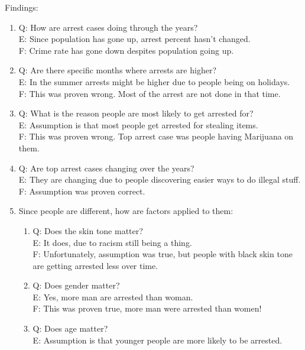 \documentclass{article}\usepackage[]{graphicx}\usepackage[]{color}
\begin{document}
      Findings:
      \begin{enumerate}
        \item	
          Q: How are arrest cases doing through the years?\\
          E: Since population has gone up, arrest percent hasn’t changed.\\
          F: Crime rate has gone down despites population going up.
        \item
          Q: Are there specific months where arrests are higher?\\
          E: In the summer arrests might be higher due to people being on holidays.\\
          F: This was proven wrong. Most of the arrest are not done in that time.
        \item
          Q: What is the reason people are most likely to get arrested for?\\
          E: Assumption is that most people get arrested for stealing items.\\
          F: This was proven wrong. Top arrest case was people having Marijuana on them.
        \item
          Q: Are top arrest cases changing over the years?\\
          E: They are changing due to people discovering easier ways to do illegal stuff.\\
          F: Assumption was proven correct.
        \item
          Since people are different, how are factors applied to them:
          \begin{enumerate}
            \item
              Q: Does the skin tone matter?\\
              E: It does, due to racism still being a thing.\\
              F: Unfortunately, assumption was true, but people with black skin tone are getting                       arrested less over time.
            \item
              Q: Does gender matter?\\
              E: Yes, more man are arrested than woman.\\
              F: This was proven true, more man were arrested than women!
            \item
              Q: Does age matter?\\
              E: Assumption is that younger people are more likely to be arrested.\\

\end{enumerate}
\end{enumerate}
\end{document}
